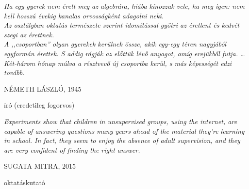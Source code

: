 \newlength\longest
\cleardoublepage
\thispagestyle{empty}
\null\vfill
{\centering
\parbox{0.8\textwidth} {%
    \raggedright{\large\itshape%
    Ha egy gyerek nem érett meg az algebrára, hiába kínozzuk vele,  
    ha meg igen: nem kell hosszú évekig kanalas orvosságként adagolni neki. \\
    Az osztályban oktatás természete szerint idomítással gyötri az éretlent 
    és kedvét szegi az érettnek. \\
    A ,,csoportban'' olyan gyerekek kerülnek össze, akik egy-egy téren 
    nagyjából egyformán érettek. S addig rágják az előttük lévő anyagot, amíg erejükből futja. \ldots Két-három hónap múlva a résztvevő új csoportba kerül, s más képességét edzi tovább.

        \par\bigskip
    }
    \raggedleft\Large\MakeUppercase{Németh László, 1945}\par%
    \raggedleft\normalsize{író (eredetileg fogorvos)}\par%
}\par%
}
\vfill\vfill
\cleardoublepage
\thispagestyle{empty}
\null\vfill
{\centering
\parbox{0.8\textwidth} {%
    \raggedright{\large\itshape%
    Experiments show that children in unsupervised groups, using the internet, are capable of answering questions many years ahead of the material they’re learning in school. In fact, they seem to enjoy the absence of adult supervision, and they are very confident of finding the right answer.

        \par\bigskip
    }
    \raggedleft\Large\MakeUppercase{Sugata Mitra, 2015}\par%
    \raggedleft\normalsize{oktatáskutató}\par%
}\par%
}

\vfill\vfill
\clearpage

